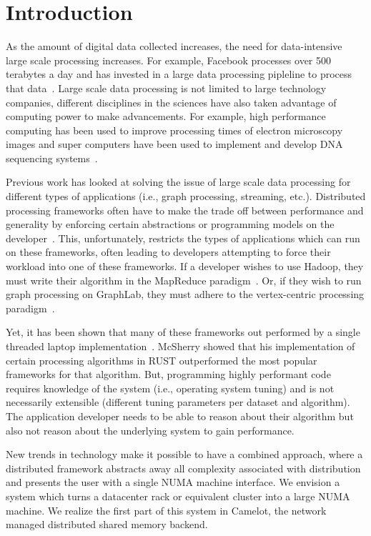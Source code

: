 \section{Introduction} 
\label{sec:intro}
As the amount of digital data collected increases, the need for data-intensive
large scale processing increases. For example, Facebook processes over 500
terabytes a day and has invested in a large data processing pipleline to process
that data~\cite{Chen2016}. Large scale data processing is not limited to large
technology companies, different disciplines in the sciences have also taken
advantage of computing power to make advancements. For example, high performance
computing has been used to improve processing times of electron microscopy
images and super computers have been used to implement and develop DNA
sequencing systems~\cite{Puckelwartz2017,Oelerich2017}.

Previous work has looked at solving the issue of large scale data processing for
different types of applications (i.e., graph processing, streaming, etc.).
Distributed processing frameworks often have to make the trade off between
performance and generality by enforcing certain abstractions or programming
models on the developer~\cite{Dean2004,Low2010,Murray2013}. 
This, unfortunately, restricts the types of applications which can run on these
frameworks, often leading to developers attempting to force their workload into
one of these frameworks. If a developer wishes to use Hadoop, they must write
their algorithm in the MapReduce paradigm~\cite{Dean2004}. Or, if they wish to
run graph processing on GraphLab, they must adhere to the vertex-centric
processing paradigm~\cite{Low2010}.

Yet, it has been shown that many of these frameworks out performed by a single
threaded laptop implementation~\cite{189908}. McSherry showed that his
implementation of certain processing algorithms in RUST outperformed the most
popular frameworks for that algorithm. But, programming highly performant code
requires knowledge of the system (i.e., operating system tuning) and is not
necessarily extensible  (different tuning parameters per dataset and algorithm).
The application developer needs to be able to reason about their algorithm but
also not reason about the underlying system to gain performance. 

New trends in technology make it possible to have a combined approach, where a
distributed framework abstracts away all complexity associated with distribution
and presents the user with a single NUMA machine interface. We envision a system
which turns a datacenter rack or equivalent cluster into a large NUMA machine.
We realize the first part of this system in Camelot, the network managed
distributed shared memory backend. 

